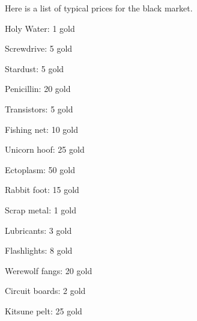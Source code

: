 \documentclass[green]{guildcamp3}
\begin{document}
	
	\name{\gBlackMarket{}}
	
	Here is a list of typical prices for the black market. 
	
	Holy Water: 1 gold
	
	Screwdrive: 5 gold
	
	Stardust: 5 gold
	
	Penicillin: 20 gold
	
	Transistors: 5 gold
	
	Fishing net: 10 gold
	
	Unicorn hoof: 25 gold
	
	Ectoplasm: 50 gold
	
	Rabbit foot: 15 gold
	
	Scrap metal: 1 gold
	
	Lubricants: 3 gold
	
	Flashlights: 8 gold
	
	Werewolf fangs: 20 gold
	
	Circuit boards: 2 gold
	
	Kitsune pelt: 25 gold
	
\end{document}
